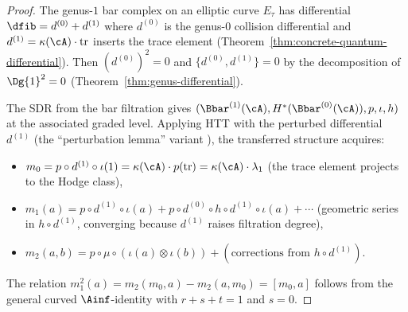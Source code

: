\begin{proof}
The genus-$1$ bar complex on an elliptic curve $E_\tau$ has
differential $\dfib = d^{(0)} + d^{(1)}$ where $d^{(0)}$ is the
genus-$0$ collision differential and $d^{(1)} = \kappa(\cA) \cdot
\mathrm{tr}$ inserts the trace element
(Theorem~\ref{thm:concrete-quantum-differential}).
Then $(d^{(0)})^2 = 0$ and $\{d^{(0)}, d^{(1)}\} = 0$
by the decomposition of
$\Dg{1}^2 = 0$ (Theorem~\ref{thm:genus-differential}).

The SDR from the bar filtration gives
$(\Bbar^{(1)}(\cA), H^*(\Bbar^{(0)}(\cA)), p, \iota, h)$
at the associated graded level. Applying HTT with the perturbed
differential $d^{(1)}$ (the ``perturbation lemma'' variant
\cite{LV12}), the transferred structure acquires:
\begin{itemize}
\item $m_0 = p \circ d^{(1)} \circ \iota(1) = \kappa(\cA) \cdot
p(\mathrm{tr}) = \kappa(\cA) \cdot \lambda_1$ (the trace element
projects to the Hodge class),
\item $m_1(a) = p \circ d^{(1)} \circ \iota(a) + p \circ d^{(0)}
\circ h \circ d^{(1)} \circ \iota(a) + \cdots$
(geometric series in $h \circ d^{(1)}$, converging
because $d^{(1)}$ raises filtration degree),
\item $m_2(a,b) = p \circ \mu \circ (\iota(a) \otimes \iota(b))
+ (\text{corrections from } h \circ d^{(1)})$.
\end{itemize}
The relation $m_1^2(a) = m_2(m_0, a) - m_2(a, m_0) = [m_0, a]$
follows from the general curved $\Ainf$-identity with $r+s+t = 1$
and $s = 0$.
\end{proof}

